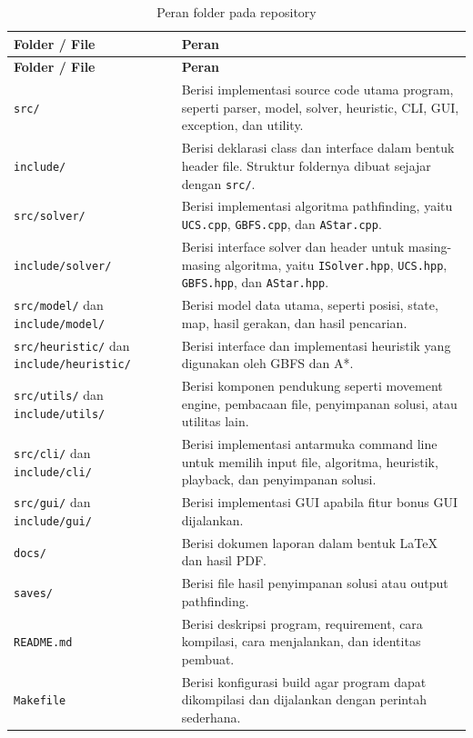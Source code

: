 \begin{longtable}{|p{3.5cm}|p{10.5cm}|}
	\caption{Peran folder pada repository} \\
	\hline
	\rowcolor{gray!20}
	\textbf{Folder / File} & \textbf{Peran} \\
	\hline
	\endfirsthead
	
	\hline
	\rowcolor{gray!20}
	\textbf{Folder / File} & \textbf{Peran} \\
	\hline
	\endhead
	
	\texttt{src/} & Berisi implementasi source code utama program, seperti parser, model, solver, heuristic, CLI, GUI, exception, dan utility. \\
	\hline
	\texttt{include/} & Berisi deklarasi class dan interface dalam bentuk header file. Struktur foldernya dibuat sejajar dengan \texttt{src/}. \\
	\hline
	\texttt{src/solver/} & Berisi implementasi algoritma pathfinding, yaitu \texttt{UCS.cpp}, \texttt{GBFS.cpp}, dan \texttt{AStar.cpp}. \\
	\hline
	\texttt{include/solver/} & Berisi interface solver dan header untuk masing-masing algoritma, yaitu \texttt{ISolver.hpp}, \texttt{UCS.hpp}, \texttt{GBFS.hpp}, dan \texttt{AStar.hpp}. \\
	\hline
	\texttt{src/model/} dan \texttt{include/model/} & Berisi model data utama, seperti posisi, state, map, hasil gerakan, dan hasil pencarian. \\
	\hline
	\texttt{src/heuristic/} dan \texttt{include/heuristic/} & Berisi interface dan implementasi heuristik yang digunakan oleh GBFS dan A*. \\
	\hline
	\texttt{src/utils/} dan \texttt{include/utils/} & Berisi komponen pendukung seperti movement engine, pembacaan file, penyimpanan solusi, atau utilitas lain. \\
	\hline
	\texttt{src/cli/} dan \texttt{include/cli/} & Berisi implementasi antarmuka command line untuk memilih input file, algoritma, heuristik, playback, dan penyimpanan solusi. \\
	\hline
	\texttt{src/gui/} dan \texttt{include/gui/} & Berisi implementasi GUI apabila fitur bonus GUI dijalankan. \\
	\hline
	\texttt{docs/} & Berisi dokumen laporan dalam bentuk LaTeX dan hasil PDF. \\
	\hline
	\texttt{saves/} & Berisi file hasil penyimpanan solusi atau output pathfinding. \\
	\hline
	\texttt{README.md} & Berisi deskripsi program, requirement, cara kompilasi, cara menjalankan, dan identitas pembuat. \\
	\hline
	\texttt{Makefile} & Berisi konfigurasi build agar program dapat dikompilasi dan dijalankan dengan perintah sederhana. \\
	\hline
\end{longtable}

